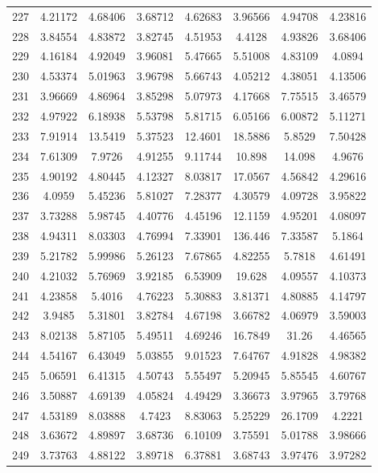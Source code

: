 \begin{figure}
\begin{tabular}{cccccccc}
227 & 4.21172 & 4.68406 & 3.68712 & 4.62683 & 3.96566 & 4.94708 & 4.23816\\
228 & 3.84554 & 4.83872 & 3.82745 & 4.51953 & 4.4128 & 4.93826 & 3.68406\\
229 & 4.16184 & 4.92049 & 3.96081 & 5.47665 & 5.51008 & 4.83109 & 4.0894\\
230 & 4.53374 & 5.01963 & 3.96798 & 5.66743 & 4.05212 & 4.38051 & 4.13506\\
231 & 3.96669 & 4.86964 & 3.85298 & 5.07973 & 4.17668 & 7.75515 & 3.46579\\
232 & 4.97922 & 6.18938 & 5.53798 & 5.81715 & 6.05166 & 6.00872 & 5.11271\\
233 & 7.91914 & 13.5419 & 5.37523 & 12.4601 & 18.5886 & 5.8529 & 7.50428\\
234 & 7.61309 & 7.9726 & 4.91255 & 9.11744 & 10.898 & 14.098 & 4.9676\\
235 & 4.90192 & 4.80445 & 4.12327 & 8.03817 & 17.0567 & 4.56842 & 4.29616\\
236 & 4.0959 & 5.45236 & 5.81027 & 7.28377 & 4.30579 & 4.09728 & 3.95822\\
237 & 3.73288 & 5.98745 & 4.40776 & 4.45196 & 12.1159 & 4.95201 & 4.08097\\
238 & 4.94311 & 8.03303 & 4.76994 & 7.33901 & 136.446 & 7.33587 & 5.1864\\
239 & 5.21782 & 5.99986 & 5.26123 & 7.67865 & 4.82255 & 5.7818 & 4.61491\\
240 & 4.21032 & 5.76969 & 3.92185 & 6.53909 & 19.628 & 4.09557 & 4.10373\\
241 & 4.23858 & 5.4016 & 4.76223 & 5.30883 & 3.81371 & 4.80885 & 4.14797\\
242 & 3.9485 & 5.31801 & 3.82784 & 4.67198 & 3.66782 & 4.06979 & 3.59003\\
243 & 8.02138 & 5.87105 & 5.49511 & 4.69246 & 16.7849 & 31.26 & 4.46565\\
244 & 4.54167 & 6.43049 & 5.03855 & 9.01523 & 7.64767 & 4.91828 & 4.98382\\
245 & 5.06591 & 6.41315 & 4.50743 & 5.55497 & 5.20945 & 5.85545 & 4.60767\\
246 & 3.50887 & 4.69139 & 4.05824 & 4.49429 & 3.36673 & 3.97965 & 3.79768\\
247 & 4.53189 & 8.03888 & 4.7423 & 8.83063 & 5.25229 & 26.1709 & 4.2221\\
248 & 3.63672 & 4.89897 & 3.68736 & 6.10109 & 3.75591 & 5.01788 & 3.98666\\
249 & 3.73763 & 4.88122 & 3.89718 & 6.37881 & 3.68743 & 3.97476 & 3.97282\\

\end{tabular}
\end{figure}

